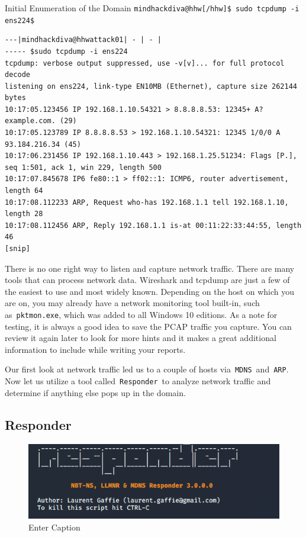 Initial Enumeration of the Domain
\verb|mindhackdiva@hhw[/hhw]$ sudo tcpdump -i ens224$|
\begin{verbatim}
---|mindhackdiva@hhwattack01| - | - | 
----- $sudo tcpdump -i ens224
tcpdump: verbose output suppressed, use -v[v]... for full protocol decode
listening on ens224, link-type EN10MB (Ethernet), capture size 262144 bytes
10:17:05.123456 IP 192.168.1.10.54321 > 8.8.8.8.53: 12345+ A? example.com. (29)
10:17:05.123789 IP 8.8.8.8.53 > 192.168.1.10.54321: 12345 1/0/0 A 93.184.216.34 (45)
10:17:06.231456 IP 192.168.1.10.443 > 192.168.1.25.51234: Flags [P.], seq 1:501, ack 1, win 229, length 500
10:17:07.845678 IP6 fe80::1 > ff02::1: ICMP6, router advertisement, length 64
10:17:08.112233 ARP, Request who-has 192.168.1.1 tell 192.168.1.10, length 28
10:17:08.112456 ARP, Reply 192.168.1.1 is-at 00:11:22:33:44:55, length 46
[snip]
\end{verbatim}
There is no one right way to listen and capture network traffic. There are many tools that can process network data. Wireshark and tcpdump are just a few of the easiest to use and most widely known. Depending on the host on which you are on, you may already have a network monitoring tool built-in, such as \verb|pktmon.exe|, which was added to all Windows 10 editions. As a note for testing, it is always a good idea to save the PCAP traffic you capture. You can review it again later to look for more hints and it makes a great additional information to include while writing your reports.

Our first look at network traffic led us to a couple of hosts via \verb|MDNS| and \verb|ARP|. Now let us utilize a tool called \verb|Responder| to analyze network traffic and determine if anything else pops up in the domain.

\subsection{Responder}
\begin{figure}
    \centering
    \includegraphics[width=0.75\linewidth]{responderlogo.png}
    \caption{Enter Caption}
    \label{fig:placeholder}
\end{figure}

